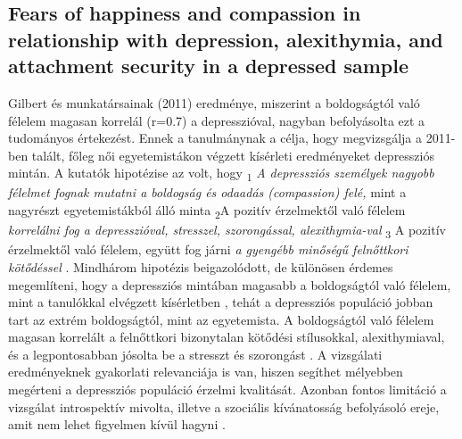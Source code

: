 \subsection{Fears of happiness and compassion in relationship
	with depression, alexithymia, and attachment
	security in a depressed sample \cite{gilbert_mcewan_catarino_baiao_palmeira_2013}}
Gilbert és munkatársainak (2011) eredménye, miszerint a boldogságtól való félelem magasan korrelál (r=0.7) a depresszióval, nagyban befolyásolta ezt a tudományos értekezést. Ennek a tanulmánynak a célja, hogy megvizsgálja a 2011-ben talált, főleg női egyetemistákon végzett kísérleti eredményeket depressziós mintán. A kutatók hipotézise az volt,  hogy \textsubscript{1} \textit{ A depressziós személyek nagyobb félelmet fognak mutatni a boldogság és odaadás (compassion) felé,}  mint a nagyrészt egyetemis\-tákból álló minta \textsubscript{2}A pozitív érzelmektől való félelem \textit{korrelálni fog a depresszióval, stresszel, szorongással, alexithymia-val }   \textsubscript{3} A pozitív érzelmektől való félelem, együtt fog járni \textit{a gyengébb minőségű felnőttkori kötődéssel} \cite{gilbert_mcewan_catarino_baiao_palmeira_2013}. Mindhárom hipotézis beigazolódott, de különösen érdemes megemlíteni, hogy a depressziós mintában magasabb a boldogságtól való félelem, mint a tanulókkal elvégzett kísérletben \cite{gilbert_mcewan_gibbons_chotai_duarte_matos_2011}, tehát a depressziós populáció jobban tart az extrém boldogságtól, mint az egyetemista. A boldogságtól való félelem magasan korrelált a felnőttkori bizonytalan kötődési stílusokkal, alexithymiaval, és a legpontosabban jósolta be a stresszt és szorongást \cite{gilbert_mcewan_catarino_baiao_palmeira_2013}. A vizsgálati eredményeknek gyakorlati relevanciája is van, hiszen segíthet mélyebben megérteni a depressziós populáció érzelmi kvalitását. Azonban fontos limitáció a vizsgálat introspektív mivolta, illetve a szociális kívánatosság befolyásoló ereje, amit nem lehet figyelmen kívül hagyni \cite{gilbert_mcewan_catarino_baiao_palmeira_2013}.

